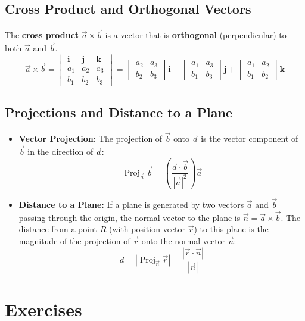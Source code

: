 \documentclass[11pt]{article}
\theoremstyle{definition}
\begin{document}
\subsection{Cross Product and Orthogonal Vectors}
The \textbf{cross product} $\vec{a} \times \vec{b}$ is a vector that is \textbf{orthogonal} (perpendicular) to both $\vec{a}$ and $\vec{b}$.
\[
\vec{a} \times \vec{b} = 
\begin{vmatrix}
\mathbf{i} & \mathbf{j} & \mathbf{k} \\
a_1 & a_2 & a_3 \\
b_1 & b_2 & b_3
\end{vmatrix}
= 
\begin{vmatrix}
a_2 & a_3 \\
b_2 & b_3
\end{vmatrix}\mathbf{i}
-
\begin{vmatrix}
a_1 & a_3 \\
b_1 & b_3
\end{vmatrix}\mathbf{j}
+
\begin{vmatrix}
a_1 & a_2 \\
b_1 & b_2
\end{vmatrix}\mathbf{k}
\]

\subsection{Projections and Distance to a Plane}
\begin{itemize}
    \item \textbf{Vector Projection:} The projection of $\vec{b}$ onto $\vec{a}$ is the vector component of $\vec{b}$ in the direction of $\vec{a}$:
    \[ \operatorname{Proj}_{\vec{a}} \vec{b} = \left( \frac{\vec{a} \cdot \vec{b}}{|\vec{a}|^2} \right) \vec{a} \]
    \item \textbf{Distance to a Plane:} If a plane is generated by two vectors $\vec{a}$ and $\vec{b}$ passing through the origin, the normal vector to the plane is $\vec{n} = \vec{a} \times \vec{b}$. The distance from a point $R$ (with position vector $\vec{r}$) to this plane is the magnitude of the projection of $\vec{r}$ onto the normal vector $\vec{n}$:
    \[ d = \left| \operatorname{Proj}_{\vec{n}} \vec{r} \right| = \frac{|\vec{r} \cdot \vec{n}|}{|\vec{n}|} \]
\end{itemize}

\section{Exercises}
\end{document}
